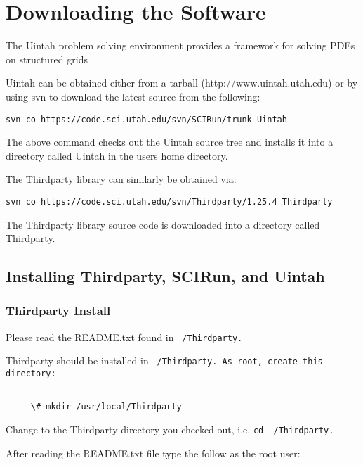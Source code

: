 \section{Downloading the Software} \label{Sec:download}

The Uintah problem solving environment provides a framework for solving PDEs on structured grids

Uintah can be obtained either from a tarball (http://www.uintah.utah.edu) or by using svn to download the latest source from the following:

\begin{Verbatim}[fontsize=\footnotesize]
svn co https://code.sci.utah.edu/svn/SCIRun/trunk Uintah
\end{Verbatim}

The above command checks out the Uintah source tree and installs it
into a directory called Uintah in the users home directory.

The Thirdparty library can similarly be obtained via:
\begin{Verbatim}[fontsize=\footnotesize]
svn co https://code.sci.utah.edu/svn/Thirdparty/1.25.4 Thirdparty
\end{Verbatim}

The Thirdparty library source code is downloaded into a directory
called Thirdparty.

\subsection{Installing Thirdparty, SCIRun, and Uintah}

\subsubsection{Thirdparty Install}


Please read the README.txt found in \tt~/Thirdparty.\normalfont

Thirdparty should be installed in \tt~/Thirdparty.\normalfont
As root, create this directory:

\begin{Verbatim}[fontsize=\footnotesize]

     \# mkdir /usr/local/Thirdparty

\end{Verbatim}

Change to the Thirdparty directory you checked out, i.e. \tt cd ~/Thirdparty.\normalfont

After reading the README.txt file type the follow as the root user:

